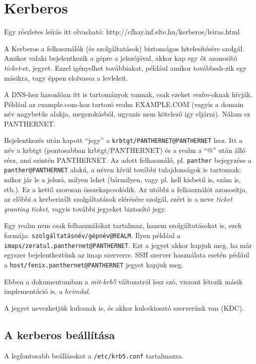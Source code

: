 \chapter{Kerberos}\label{cha:Kerberos}

Egy részletes leírás itt olvasható: http://cfhay.inf.elte.hu/kerberos/leiras.html

A Kerberos a felhasználók (és szolgáltatások) biztonságos hitelesítésére szolgál. Amikor valaki bejelentkezik a gépre
a jelszójával, akkor kap egy őt azonosító \emph{ticket}-et, jegyet. Ezzel igényelhet továbbiakat, például amikor
továbbssh-zik egy másikra, vagy éppen elolvassa a levleleit.

A DNS-hez hasonlóan itt is tartományok vannak, csak ezeket \emph{realm}-oknak hívják. Például az example.com-hoz
tartozó realm EXAMPLE.COM (vagyis a domain név nagybetűs alakja, megszokásból, ugyanis nem kötelező így
eljárni). Nálam ez PANTHERNET.

Bejelentkezés után kapott ``jegy'' a \texttt{krbtgt/PANTHERNET@PANTHERNET} lesz. Itt a név a krbtgt (pontosabban
krbtgt/PANTHERNET) és a realm a ``@'' után álló rész, ami szintén PANTHERNET. Az adott felhasználó,
pl. \texttt{panther} bejegyzése a \texttt{panther@PANTHERNET} alakú, a néven kívül további tulajdonságok is tartoznak:
mikor jár le a jelszó, milyen lehet (bármilyen, vagy pl. kell kisbetű is, szám is, stb.). Ez a kettő szorosan
összekapcsolódik. Az utóbbi a felhasználót azonosítja, az előbbi a kerberizált szolgáltatások elérésére szolgál, ezért
is a neve \emph{ticket granting ticket}, vagyis további jegyeket biztosító jegy.

Egy realm nem csak felhasználókat tartalmaz, hanem szolgáltatásokat is, ezek formája:
\texttt{szolgáltatásnév/gépnév@REALM}. Ilyen például a \texttt{imaps/zeratul.panthernet@PANTHERNET}. Ezt a jegyet
akkor kapjuk meg, ha már egyszer bejelentkeztünk az imap szerverre. SSH szerver használata esetén pédául a
\texttt{host/fenix.panthernet@PANTHERNET} jegyet kapjuk meg.

Ebben a dokumentumban a \emph{mit-krb5} változatról lesz szó, viszont létezik másik implementáció is, a \emph{heimdal}.

A jegyet nevezhetjük kulcsnak is, és akkor kulcskiosztó szerverünk van (KDC).
\section{A kerberos beállítása}
A legfontosabb beállásokat a \texttt{/etc/krb5.conf} tartalmazza.

